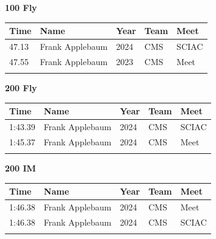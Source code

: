 \vspace{1.2em}
\noindent\begin{minipage}[t]{0.98\textwidth}
\centering
\textbf{\textcolor{teamprimary}{100 Fly}}\par
\vspace{0.5em}
\centering
\small
\renewcommand{\arraystretch}{1.0}
\setlength{\tabcolsep}{4pt}
\begin{tabular}{@{}p{2.5cm}p{4.5cm}p{1.5cm}p{2.5cm}p{2.5cm}@{}}
\toprule
\textbf{Time} & \textbf{Name} & \textbf{Year} & \textbf{Team} & \textbf{Meet} \\
\midrule
47.13 & Frank Applebaum & 2024 & CMS & SCIAC \\
47.55 & Frank Applebaum & 2023 & CMS & Meet \\
\bottomrule
\vspace{0.5em}
\end{tabular}
\end{minipage}
\vspace{1.2em}
\noindent\begin{minipage}[t]{0.98\textwidth}
\centering
\textbf{\textcolor{teamprimary}{200 Fly}}\par
\vspace{0.5em}
\centering
\small
\renewcommand{\arraystretch}{1.0}
\setlength{\tabcolsep}{4pt}
\begin{tabular}{@{}p{2.5cm}p{4.5cm}p{1.5cm}p{2.5cm}p{2.5cm}@{}}
\toprule
\textbf{Time} & \textbf{Name} & \textbf{Year} & \textbf{Team} & \textbf{Meet} \\
\midrule
1:43.39 & Frank Applebaum & 2024 & CMS & SCIAC \\
1:45.37 & Frank Applebaum & 2024 & CMS & Meet \\
\bottomrule
\vspace{0.5em}
\end{tabular}
\end{minipage}
\vspace{1.2em}
\noindent\begin{minipage}[t]{0.98\textwidth}
\centering
\textbf{\textcolor{teamprimary}{200 IM}}\par
\vspace{0.5em}
\centering
\small
\renewcommand{\arraystretch}{1.0}
\setlength{\tabcolsep}{4pt}
\begin{tabular}{@{}p{2.5cm}p{4.5cm}p{1.5cm}p{2.5cm}p{2.5cm}@{}}
\toprule
\textbf{Time} & \textbf{Name} & \textbf{Year} & \textbf{Team} & \textbf{Meet} \\
\midrule
1:46.38 & Frank Applebaum & 2024 & CMS & Meet \\
1:46.38 & Frank Applebaum & 2024 & CMS & SCIAC \\
\bottomrule
\vspace{0.5em}
\end{tabular}
\end{minipage}
